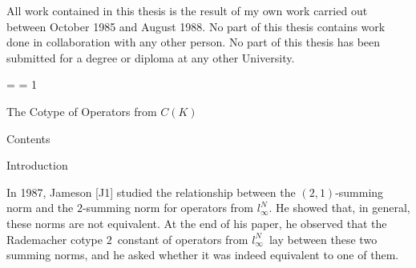 All work contained in this thesis is the result of my own work carried
out
between October 1985 and August 1988. No part of this thesis contains
work done
in collaboration with any other person. No part of this thesis has
been
submitted for a degree or diploma at any other University.
 
\bigskip
\bigskip
\hfill\vbox{}
 
\vfill
\eject
 
\footline={\hss\tenrm\folio\hss}
\pageno = 1
 
\beginsection The Cotype of Operators from $C(K)$
 
\beginsection Contents
 
 
\beginsection Introduction
 
In 1987, Jameson [J1] studied the relationship between the $(2,1)$-summing
norm
and the $2$-summing norm for operators from $l_\infty^N$. He showed
that, in
general, these norms are not equivalent. At the end of his paper,
he observed
that the Rademacher cotype $2$\ constant of operators from $l_\infty^N$\
lay
between these two summing norms, and he asked whether it was indeed
equivalent
to one of them.
 
